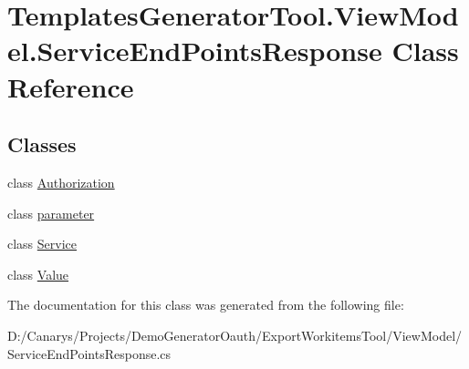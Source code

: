 \hypertarget{class_templates_generator_tool_1_1_view_model_1_1_service_end_points_response}{}\section{Templates\+Generator\+Tool.\+View\+Model.\+Service\+End\+Points\+Response Class Reference}
\label{class_templates_generator_tool_1_1_view_model_1_1_service_end_points_response}
\subsection*{Classes}
\begin{DoxyCompactItemize}
\item 
class \mbox{\hyperlink{class_templates_generator_tool_1_1_view_model_1_1_service_end_points_response_1_1_authorization}{Authorization}}
\item 
class \mbox{\hyperlink{class_templates_generator_tool_1_1_view_model_1_1_service_end_points_response_1_1parameter}{parameter}}
\item 
class \mbox{\hyperlink{class_templates_generator_tool_1_1_view_model_1_1_service_end_points_response_1_1_service}{Service}}
\item 
class \mbox{\hyperlink{class_templates_generator_tool_1_1_view_model_1_1_service_end_points_response_1_1_value}{Value}}
\end{DoxyCompactItemize}


The documentation for this class was generated from the following file\+:\begin{DoxyCompactItemize}
\item 
D\+:/\+Canarys/\+Projects/\+Demo\+Generator\+Oauth/\+Export\+Workitems\+Tool/\+View\+Model/Service\+End\+Points\+Response.\+cs\end{DoxyCompactItemize}
